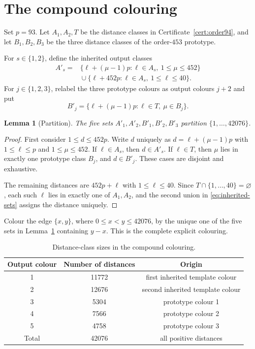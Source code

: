 \documentclass[11pt]{article}
\newtheorem{lemma}[theorem]{Lemma}
\theoremstyle{definition}
\theoremstyle{remark}
\begin{document}
\section{The compound colouring}
\label{sec:compound}

Set $p=93$.  Let $A_1,A_2,T$ be the distance classes in
Certificate~\ref{cert:order94}, and let $B_1,B_2,B_3$ be the three distance
classes of the order-$453$ prototype.

For $s\in\{1,2\}$, define the inherited output classes
\begin{equation}
\begin{split}
A'_s={}&
\{\ell+(\mu-1)p:\ell\in A_s,\ 1\le\mu\le452\}\\
&{}\cup
\{\ell+452p:\ell\in A_s,\ 1\le\ell\le40\}.
\end{split}
\label{eq:inherited-sets}
\end{equation}
For $j\in\{1,2,3\}$, relabel the three prototype colours as output colours
$j+2$ and put
\begin{equation}
  B'_j=\{\ell+(\mu-1)p:\ell\in T,\ \mu\in B_j\}.
  \label{eq:prototype-sets}
\end{equation}

\begin{lemma}[Partition]
\label{lem:partition}
The five sets $A'_1,A'_2,B'_1,B'_2,B'_3$ partition
$\{1,\ldots,42076\}$.
\end{lemma}

\begin{proof}
First consider $1\le d\le452p$.  Write $d$ uniquely as
$d=\ell+(\mu-1)p$ with $1\le\ell\le p$ and $1\le\mu\le452$.
If $\ell\in A_s$, then $d\in A'_s$.  If $\ell\in T$, then $\mu$ lies in
exactly one prototype class $B_j$, and $d\in B'_j$.  These cases are
disjoint and exhaustive.

The remaining distances are $452p+\ell$ with $1\le\ell\le40$.  Since
$T\cap\{1,\ldots,40\}=\varnothing$, each such $\ell$ lies in exactly one
of $A_1,A_2$, and the second union in \eqref{eq:inherited-sets} assigns the
distance uniquely.
\end{proof}

Colour the edge $\{x,y\}$, where $0\le x<y\le42076$, by the unique one of
the five sets in Lemma~\ref{lem:partition} containing $y-x$.  This is the
complete explicit colouring.

\begin{table}[htbp]
\centering
\caption{Distance-class sizes in the compound colouring.}
\label{tab:class-sizes}
\begin{tabular}{@{}ccc@{}}
\toprule
Output colour & Number of distances & Origin\\
\midrule
1 & 11772 & first inherited template colour\\
2 & 12676 & second inherited template colour\\
3 & 5304  & prototype colour 1\\
4 & 7566  & prototype colour 2\\
5 & 4758  & prototype colour 3\\
\midrule
Total & 42076 & all positive distances\\
\bottomrule
\end{tabular}
\end{table}
\end{document}
